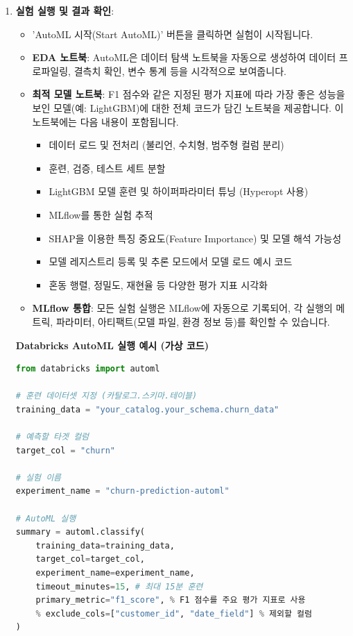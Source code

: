 \documentclass[11pt,a4paper]{article}
\theoremstyle{definition}
\begin{document}
\begin{itemize}
\begin{itemize}
\begin{itemize}
\begin{itemize}
\begin{itemize}
\begin{enumerate}
    \item \textbf{실험 실행 및 결과 확인}:
    \begin{itemize}
        \item 'AutoML 시작(Start AutoML)' 버튼을 클릭하면 실험이 시작됩니다.
        \item \textbf{EDA 노트북}: AutoML은 데이터 탐색 노트북을 자동으로 생성하여 데이터 프로파일링, 결측치 확인, 변수 통계 등을 시각적으로 보여줍니다.
        \item \textbf{최적 모델 노트북}: F1 점수와 같은 지정된 평가 지표에 따라 가장 좋은 성능을 보인 모델(예: LightGBM)에 대한 전체 코드가 담긴 노트북을 제공합니다. 이 노트북에는 다음 내용이 포함됩니다.
        \begin{itemize}
            \item 데이터 로드 및 전처리 (불리언, 수치형, 범주형 컬럼 분리)
            \item 훈련, 검증, 테스트 세트 분할
            \item LightGBM 모델 훈련 및 하이퍼파라미터 튜닝 (Hyperopt 사용)
            \item MLflow를 통한 실험 추적
            \item SHAP을 이용한 특징 중요도(Feature Importance) 및 모델 해석 가능성
            \item 모델 레지스트리 등록 및 추론 모드에서 모델 로드 예시 코드
            \item 혼동 행렬, 정밀도, 재현율 등 다양한 평가 지표 시각화
        \end{itemize}
        \item \textbf{MLflow 통합}: 모든 실험 실행은 MLflow에 자동으로 기록되어, 각 실행의 메트릭, 파라미터, 아티팩트(모델 파일, 환경 정보 등)를 확인할 수 있습니다.
    \end{itemize}

\begin{examplebox}
\textbf{Databricks AutoML 실행 예시 (가상 코드)}
\begin{lstlisting}[language=Python, caption=Databricks AutoML 실행 코드 스니펫, label=lst:automl_run]
from databricks import automl

# 훈련 데이터셋 지정 (카탈로그.스키마.테이블)
training_data = "your_catalog.your_schema.churn_data"

# 예측할 타겟 컬럼
target_col = "churn"

# 실험 이름
experiment_name = "churn-prediction-automl"

# AutoML 실행
summary = automl.classify(
    training_data=training_data,
    target_col=target_col,
    experiment_name=experiment_name,
    timeout_minutes=15, # 최대 15분 훈련
    primary_metric="f1_score", % F1 점수를 주요 평가 지표로 사용
    % exclude_cols=["customer_id", "date_field"] % 제외할 컬럼
)


\end{lstlisting}
\end{examplebox}
\end{enumerate}
\end{itemize}
\end{itemize}
\end{itemize}
\end{itemize}
\end{itemize}
\end{document}

